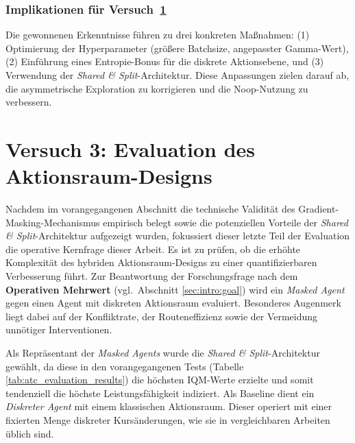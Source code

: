 \subsubsection*{Implikationen für Versuch~\ref{sec:versuch3}}
Die gewonnenen Erkenntnisse führen zu drei konkreten Maßnahmen: (1) Optimierung der Hyperparameter (größere Batchsize, angepasster Gamma-Wert), (2) Einführung eines Entropie-Bonus für die diskrete Aktionsebene, und (3) Verwendung der \emph{Shared \& Split}-Architektur. Diese Anpassungen zielen darauf ab, die asymmetrische Exploration zu korrigieren und die Noop-Nutzung zu verbessern.





\section{Versuch 3: Evaluation des Aktionsraum-Designs}
\label{sec:versuch3}

Nachdem im vorangegangenen Abschnitt die technische Validität des Gradient\hyp{}Masking\hyp{}Mechanismus empirisch belegt sowie die potenziellen Vorteile der \textit{Shared \& Split}-Architektur aufgezeigt wurden, fokussiert dieser letzte Teil der Evaluation die operative Kernfrage dieser Arbeit. Es ist zu prüfen, ob die erhöhte Komplexität des hybriden Aktionsraum-Designs zu einer quantifizierbaren Verbesserung führt.
Zur Beantwortung der Forschungsfrage nach dem \textbf{Operativen Mehrwert} (vgl.~Abschnitt \ref{sec:intro:goal}) wird ein \textit{Masked Agent} gegen einen Agent mit diskreten Aktionsraum evaluiert. Besonderes Augenmerk liegt dabei auf der Konfliktrate, der Routeneffizienz sowie der Vermeidung unnötiger Interventionen.
\medskip

Als Repräsentant der \textit{Masked Agents} wurde die \textit{Shared \& Split}-Architektur gewählt, da diese in den vorangegangenen Tests (Tabelle \ref{tab:atc_evaluation_results}) die höchsten \ac{IQM}-Werte erzielte und somit tendenziell die höchste Leistungsfähigkeit indiziert.
Als Baseline dient ein \textit{Diskreter Agent} mit einem klassischen Aktionsraum. Dieser operiert mit einer fixierten Menge diskreter Kursänderungen, wie sie in vergleichbaren Arbeiten üblich sind.

